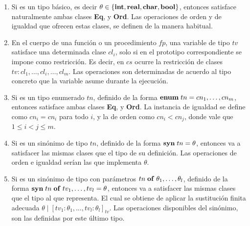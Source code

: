 \begin{enumerate}
\item Si es un tipo básico, es decir $\theta \in \{ \mathbf{int}, \mathbf{real}, \mathbf{char}, \mathbf{bool} \}$, entonces satisface naturalmente ambas clases \textbf{Eq}, y \textbf{Ord}.
Las operaciones de orden y de igualdad que ofrecen estas clases, se definen de la manera habitual.

\iffalse
\item Si es un tipo puntero $\T{pointer} \; \theta$, solo va a satisfacer la clase \textbf{Eq}.
Esta condición es independiente del tipo $\theta$.
La igualdad de punteros se determina en base al lugar de memoria que se referencia, y no al valor almacenado en el.
\item Si es un arreglo $\T{array} \; as_1, \ldots, as_n \; \T{of} \; \theta$, solo podrá satisfacer la clase \textbf{Eq}.
Condicionado a que el tipo $\theta$ también sea instancia de esta misma clase.
La igualdad depende que todos los valores almacenados en las distintas posiciones de los arreglos sean equivalentes.
\fi

\item En el cuerpo de una función o un procedimiento $fp$, una variable de tipo $tv$ satisface una determinada clase $cl_{i}$, solo si en el prototipo correspondiente se impone como restricción.
Es decir, en $cs$ ocurre la restricción de clases $tv : cl_1, \ldots, cl_{i}, \ldots, cl_m$.
Las operaciones son determinadas de acuerdo al tipo concreto que la variable asume durante la ejecución.
\item Si es un tipo enumerado $tn$, definido de la forma $\mathbf{enum} \; tn = cn_1, \ldots, cn_m$, entonces satisface ambas clases \textbf{Eq}, y \textbf{Ord}.
La instancia de igualdad se define como $cn_i = cn_i$ para todo $i$, y la de orden como $cn_i < cn_{j}$, donde vale que $1 \leq i < j \leq m$.
\item Si es un sinónimo de tipo $tn$, definido de la forma $\mathbf{syn} \; tn = \theta$, entonces va a satisfacer las mismas clases que el tipo de su definición.
Las operaciones de orden e igualdad serían las que implementa $\theta$.
\item Si es un sinónimo de tipo con parámetros $tn \; \mathbf{of} \; \theta_1, \ldots, \theta_l$, definido de la forma $\mathbf{syn} \; tn \; \mathbf{of} \allowbreak \; tv_1, \dots, tv_l = \theta$, entonces va a satisfacer las mismas clases que el tipo al que representa.
El cual se obtiene de aplicar la sustitución finita adecuada $\theta \mid [tv_1 : \theta_1, \ldots, tv_l : \theta_l]_{tv}$.
Las operaciones disponibles del sinónimo, son las definidas por este último tipo.


\end{enumerate}
